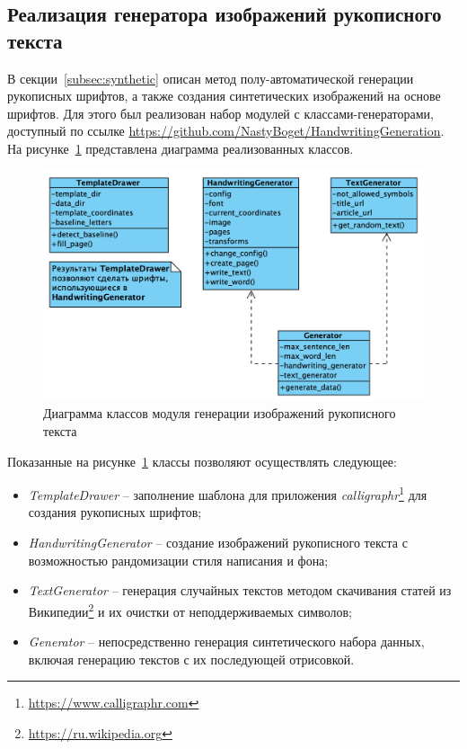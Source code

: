 \subsection{Реализация генератора изображений рукописного текста}
\label{subsec:handwriting-generation}

В секции~\ref{subsec:synthetic} описан метод полу-автоматической генерации рукописных шрифтов, а также создания синтетических изображений на основе шрифтов.
Для этого был реализован набор модулей с классами-генераторами, доступный по ссылке \url{https://github.com/NastyBoget/HandwritingGeneration}.
На рисунке~\ref{fig:diagram_handwriting_generation} представлена диаграмма реализованных классов.

\begin{figure}[h!]
    \centering
    \includegraphics[width=\textwidth]{img/diagram_handwriting_generation}
    \caption{Диаграмма классов модуля генерации изображений рукописного текста}
    \label{fig:diagram_handwriting_generation}
\end{figure}

Показанные на рисунке~\ref{fig:diagram_handwriting_generation} классы позволяют осуществлять следующее:
\begin{itemize}
    \item \textit{TemplateDrawer} -- заполнение шаблона для приложения \textit{calligraphr}\footnote{\url{https://www.calligraphr.com}} для создания рукописных шрифтов;
    \item \textit{HandwritingGenerator} -- создание изображений рукописного текста с возможностью рандомизации стиля написания и фона;
    \item \textit{TextGenerator} -- генерация случайных текстов методом скачивания статей из Википедии\footnote{\url{https://ru.wikipedia.org}} и их очистки от неподдерживаемых символов;
    \item \textit{Generator} -- непосредственно генерация синтетического набора данных, включая генерацию текстов с их последующей отрисовкой.
\end{itemize}

